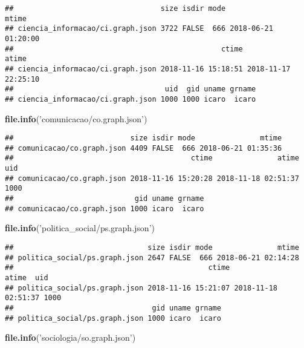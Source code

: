 \documentclass[]{article}
\newenvironment{Shaded}{\begin{snugshade}}{\end{snugshade}}
\newcommand{\KeywordTok}[1]{\textcolor[rgb]{0.13,0.29,0.53}{\textbf{#1}}}
\newcommand{\StringTok}[1]{\textcolor[rgb]{0.31,0.60,0.02}{#1}}
\newcommand{\NormalTok}[1]{#1}
\begin{document}
\begin{verbatim}
##                                  size isdir mode               mtime
## ciencia_informacao/ci.graph.json 3722 FALSE  666 2018-06-21 01:20:00
##                                                ctime               atime
## ciencia_informacao/ci.graph.json 2018-11-16 15:18:51 2018-11-17 22:25:10
##                                   uid  gid uname grname
## ciencia_informacao/ci.graph.json 1000 1000 icaro  icaro
\end{verbatim}

\begin{Shaded}
\begin{Highlighting}[]
\KeywordTok{file.info}\NormalTok{(}\StringTok{'comunicacao/co.graph.json'}\NormalTok{)}
\end{Highlighting}
\end{Shaded}

\begin{verbatim}
##                           size isdir mode               mtime
## comunicacao/co.graph.json 4409 FALSE  666 2018-06-21 01:35:36
##                                         ctime               atime  uid
## comunicacao/co.graph.json 2018-11-16 15:20:28 2018-11-18 02:51:37 1000
##                            gid uname grname
## comunicacao/co.graph.json 1000 icaro  icaro
\end{verbatim}

\begin{Shaded}
\begin{Highlighting}[]
\KeywordTok{file.info}\NormalTok{(}\StringTok{'politica_social/ps.graph.json'}\NormalTok{)}
\end{Highlighting}
\end{Shaded}

\begin{verbatim}
##                               size isdir mode               mtime
## politica_social/ps.graph.json 2647 FALSE  666 2018-06-21 02:14:28
##                                             ctime               atime  uid
## politica_social/ps.graph.json 2018-11-16 15:21:07 2018-11-18 02:51:37 1000
##                                gid uname grname
## politica_social/ps.graph.json 1000 icaro  icaro
\end{verbatim}

\begin{Shaded}
\begin{Highlighting}[]
\KeywordTok{file.info}\NormalTok{(}\StringTok{'sociologia/so.graph.json'}\NormalTok{)}
\end{Highlighting}
\end{Shaded}
\end{document}
